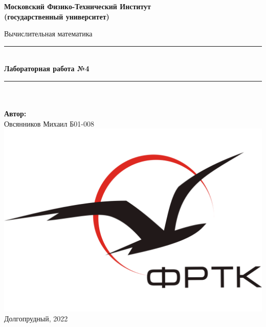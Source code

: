 \newcommand{\HRule}{\rule{\linewidth}{0.7mm}} %

\begin{center}
	\large\textbf{Московский Физико-Технический Институт}\\
	\large\textbf{(государственный университет)}
	
	\vfill
	

	
	\Large Вычислительная математика
	
	\HRule
	\\[0.4cm]
	{ \huge \bfseries Лабораторная работа №4}
	\\[0.4cm] %
	\HRule
	\\[0.5cm]
	
	\ \\
	\textbf{\large Автор:} \\	
	\large Овсянников Михаил Б01-008\\
	\vfill
	\hspace*{-0.8 cm}\includegraphics[width=100 pt]{./Include/frkt_logo.pdf}\\
	\large Долгопрудный, 2022
\end{center}

\thispagestyle{empty}

\newpage
\setcounter{page}{2}
\fancyfoot[c]{\thepage}
\fancyhead[R]{}
